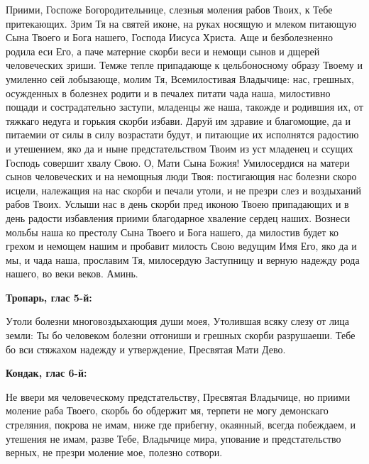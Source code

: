 Приими, Госпоже Богородительнице, слезныя моления рабов Твоих, к Тебе притекающих. Зрим Тя на святей иконе, на руках носящую и млеком питающую Сына Твоего и Бога нашего, Господа Иисуса Христа. Аще и безболезненно родила еси Его, а паче матерние скорби веси и немощи сынов и дщерей человеческих зриши. Темже тепле припадающе к цельбоносному образу Твоему и умиленно сей лобызающе, молим Тя, Всемилостивая Владычице: нас, грешных, осужденных в болезнех родити и в печалех питати чада наша, милостивно пощади и сострадательно заступи, младенцы же наша, такожде и родившия их, от тяжкаго недуга и горькия скорби избави. Даруй им здравие и благомощие, да и питаемии от силы в силу возрастати будут, и питающие их исполнятся радостию и утешением, яко да и ныне предстательством Твоим из уст младенец и ссущих Господь совершит хвалу Свою. О, Мати Сына Божия! Умилосердися на матери сынов человеческих и на немощныя люди Твоя: постигающия нас болезни скоро исцели, належащия на нас скорби и печали утоли, и не презри слез и воздыханий рабов Твоих. Услыши нас в день скорби пред иконою Твоею припадающих и в день радости избавления приими благодарное хваление сердец наших. Вознеси мольбы наша ко престолу Сына Твоего и Бога нашего, да милостив будет ко грехом и немощем нашим и пробавит милость Свою ведущим Имя Его, яко да и мы, и чада наша, прославим Тя, милосердую Заступницу и верную надежду рода нашего, во веки веков. Аминь.
\nopagebreak\bigskip\bigskip\mychapterending

 


\bfseries Тропарь, глас 5-й:\normalfont{}\nopagebreak


Утоли болезни многовоздыхающия души моея, Утолившая всяку слезу от лица земли: Ты бо человеком болезни отгониши и грешных скорби разрушаеши. Тебе бо вси стяжахом надежду и утверждение, Пресвятая Мати Дево.


\medskip


\bfseries Кондак, глас 6-й:\normalfont{}\nopagebreak


Не ввери мя человеческому предстательству, Пресвятая Владычице, но приими моление раба Твоего, скорбь бо обдержит мя, терпети не могу демонскаго стреляния, покрова не имам, ниже где прибегну, окаянный, всегда побеждаем, и утешения не имам, разве Тебе, Владычице мира, упование и предстательство верных, не презри моление мое, полезно сотвори.


\medskip


